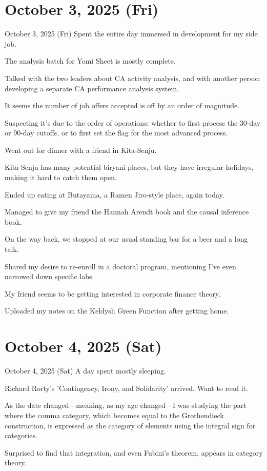 \documentclass[dvipdfmx, autodetect-engine, aspectratio=169, 10.5pt]{beamer}
\begin{document}
\section{October 3, 2025 (Fri)}

\begin{frame}{October 3, 2025 (Fri)}
Spent the entire day immersed in development for my side job.

The analysis batch for Yomi Sheet is mostly complete.

Talked with the two leaders about CA activity analysis, and with another person developing a separate CA performance analysis system.

It seems the number of job offers accepted is off by an order of magnitude.

Suspecting it's due to the order of operations: whether to first process the 30-day or 90-day cutoffs, or to first set the flag for the most advanced process.

Went out for dinner with a friend in Kita-Senju.

Kita-Senju has many potential biryani places, but they have irregular holidays, making it hard to catch them open.

Ended up eating at Butayama, a Ramen Jiro-style place, again today.

Managed to give my friend the Hannah Arendt book and the causal inference book.

On the way back, we stopped at our usual standing bar for a beer and a long talk.

Shared my desire to re-enroll in a doctoral program, mentioning I've even narrowed down specific labs.

My friend seems to be getting interested in corporate finance theory.

Uploaded my notes on the Keldysh Green Function after getting home.
\end{frame}

\section{October 4, 2025 (Sat)}

\begin{frame}{October 4, 2025 (Sat)}
A day spent mostly sleeping.

Richard Rorty's 'Contingency, Irony, and Solidarity' arrived. Want to read it.

As the date changed---meaning, as my age changed---I was studying the part where the comma category, which becomes equal to the Grothendieck construction, is expressed as the category of elements using the integral sign for categories.

Surprised to find that integration, and even Fubini's theorem, appears in category theory.
\end{frame}
\end{document}
